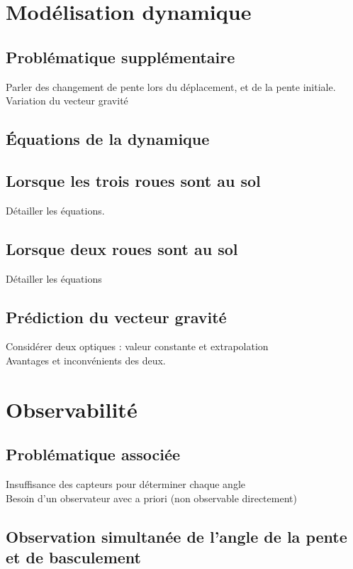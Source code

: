 \section{Modélisation dynamique}
\subsection{Problématique supplémentaire}

Parler des changement de pente lors du déplacement, et de la pente initiale.
Variation du vecteur gravité

\subsection{Équations de la dynamique}
\subsection{Lorsque les trois roues sont au sol}

Détailler les équations.

\subsection{Lorsque deux roues sont au sol}

Détailler les équations

\subsection{Prédiction du vecteur gravité}

Considérer deux optiques : valeur constante et extrapolation\\
Avantages et inconvénients des deux.

\section{Observabilité}
\subsection{Problématique associée}

Insuffisance des capteurs pour déterminer chaque angle\\
Besoin d'un observateur avec a priori (non observable directement)

\subsection{Observation simultanée de l'angle de la pente et de basculement}

